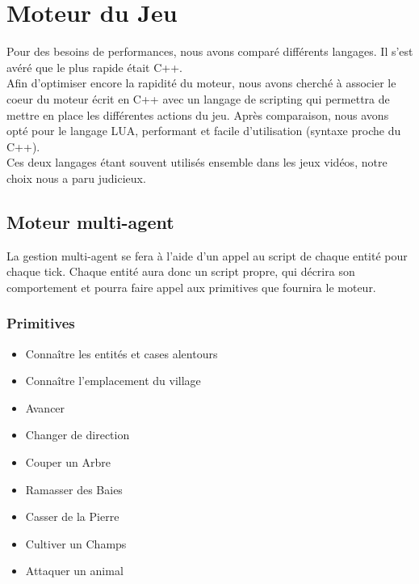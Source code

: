 \documentclass[a4paper]{article}
\begin{document}
    \section{Moteur du Jeu}
      Pour des besoins de performances, nous avons comparé différents langages. Il s'est avéré que le plus rapide était C++.\\
      Afin d'optimiser encore la rapidité du moteur, nous avons cherché à associer le coeur du moteur écrit en C++ avec un langage de scripting qui permettra de mettre en place les différentes actions du jeu. Après comparaison, nous avons opté pour le langage LUA, performant et facile d'utilisation (syntaxe proche du C++).\\
      Ces deux langages étant souvent utilisés ensemble dans les jeux vidéos, notre choix nous a paru judicieux.

      \subsection{Moteur multi-agent}
        La gestion multi-agent se fera à l'aide d'un appel 
		au script de chaque entité pour chaque tick. Chaque entité aura donc un script propre, qui décrira son comportement et pourra faire appel aux primitives que fournira le moteur.

        \subsubsection{Primitives}
          \begin{itemize} \small
            \item Connaître les entités et cases alentours
            \item Connaître l'emplacement du village
            \item Avancer
            \item Changer de direction
            \item Couper un Arbre
            \item Ramasser des Baies
            \item Casser de la Pierre
            \item Cultiver un Champs
            \item Attaquer un animal
          \end{itemize} \normalsize
\end{document}
